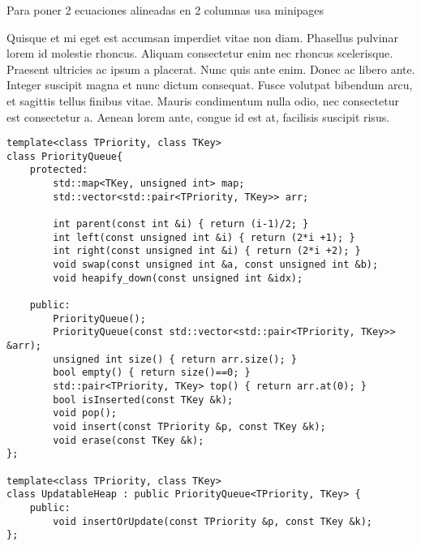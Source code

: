 \documentclass[spanish,mexico]{article}
\numberwithin{equation}{section}
\theoremstyle{definition}
\theoremstyle{remark}
\begin{document}
Para poner 2 ecuaciones alineadas en 2 columnas usa minipages

%

\newpage

Quisque et mi eget est accumsan imperdiet vitae non diam. Phasellus pulvinar lorem id molestie rhoncus. Aliquam consectetur enim nec rhoncus scelerisque. Praesent ultricies ac ipsum a placerat. Nunc quis ante enim. Donec ac libero ante. Integer suscipit magna et nunc dictum consequat. Fusce volutpat bibendum arcu, et sagittis tellus finibus vitae. Mauris condimentum nulla odio, nec consectetur est consectetur a. Aenean lorem ante, congue id est at, facilisis suscipit risus. 

\begin{verbatim}
template<class TPriority, class TKey>
class PriorityQueue{
    protected:
        std::map<TKey, unsigned int> map;
        std::vector<std::pair<TPriority, TKey>> arr;

        int parent(const int &i) { return (i-1)/2; } 
        int left(const unsigned int &i) { return (2*i +1); }     
        int right(const unsigned int &i) { return (2*i +2); } 
        void swap(const unsigned int &a, const unsigned int &b);
        void heapify_down(const unsigned int &idx);

    public:
        PriorityQueue();
        PriorityQueue(const std::vector<std::pair<TPriority, TKey>> &arr);
        unsigned int size() { return arr.size(); } 
        bool empty() { return size()==0; }
        std::pair<TPriority, TKey> top() { return arr.at(0); }
        bool isInserted(const TKey &k);
        void pop();
        void insert(const TPriority &p, const TKey &k);
        void erase(const TKey &k);
};

template<class TPriority, class TKey>
class UpdatableHeap : public PriorityQueue<TPriority, TKey> {
    public:
        void insertOrUpdate(const TPriority &p, const TKey &k);
};
\end{verbatim}



\newpage
\layout

\end{document}
